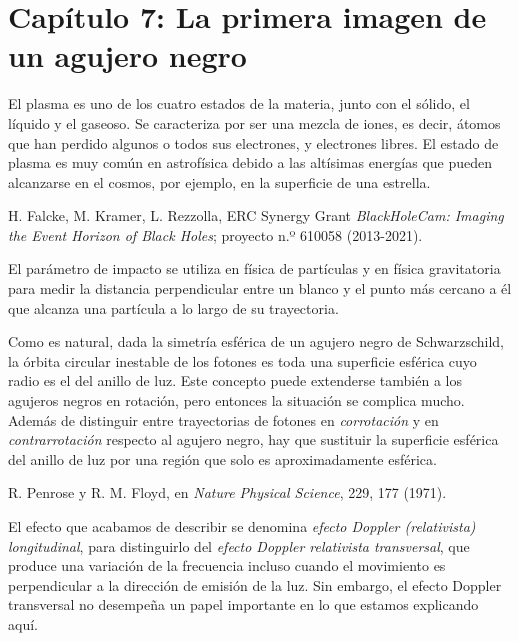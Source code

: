 \section*{Capítulo 7: La primera imagen de un agujero negro}
\begin{description}[style=multiline,leftmargin=2em,labelwidth=1.5em]

\item[1.]\hypertarget{note:07-01}{}El plasma es uno de los cuatro estados de la materia, junto con el sólido, el líquido y el gaseoso. Se caracteriza por ser una mezcla de iones, es decir, átomos que han perdido algunos o todos sus electrones, y electrones libres. El estado de plasma es muy común en astrofísica debido a las altísimas energías que pueden alcanzarse en el cosmos, por ejemplo, en la superficie de una estrella.

\item[2.]\hypertarget{note:07-02}{}H. Falcke, M. Kramer, L. Rezzolla, ERC Synergy Grant \emph{BlackHoleCam: Imaging the Event Horizon of Black Holes}; proyecto n.º 610058 (2013-2021).

\item[3.]\hypertarget{note:07-03}{}El parámetro de impacto se utiliza en física de partículas y en física gravitatoria para medir la distancia perpendicular entre un blanco y el punto más cercano a él que alcanza una partícula a lo largo de su trayectoria.

\item[4.]\hypertarget{note:07-04}{}Como es natural, dada la simetría esférica de un agujero negro de Schwarzschild, la órbita circular inestable de los fotones es toda una superficie esférica cuyo radio es el del anillo de luz. Este concepto puede extenderse también a los agujeros negros en rotación, pero entonces la situación se complica mucho. Además de distinguir entre trayectorias de fotones en \emph{corrotación} y en \emph{contrarrotación} respecto al agujero negro, hay que sustituir la superficie esférica del anillo de luz por una región que solo es aproximadamente esférica.

\item[5.]\hypertarget{note:07-05}{}R. Penrose y R. M. Floyd, en \emph{Nature Physical Science}, 229, 177 (1971).

\item[6.]\hypertarget{note:07-06}{}El efecto que acabamos de describir se denomina \emph{efecto Doppler (relativista) longitudinal}, para distinguirlo del \emph{efecto Doppler relativista transversal}, que produce una variación de la frecuencia incluso cuando el movimiento es perpendicular a la dirección de emisión de la luz. Sin embargo, el efecto Doppler transversal no desempeña un papel importante en lo que estamos explicando aquí.


\end{description}
